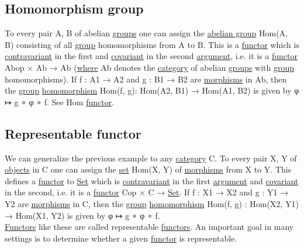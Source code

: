 \documentclass[11pt]{article}
\begin{document}
\subsection{\label{org4581f5e}Homomorphism group}
\label{sec:org06d5daf}

To every pair A, B of abelian \hyperref[org734e757]{groups} one can assign the \hyperref[org1992f6e]{abelian group} Hom(A, B) consisting of all \hyperref[orgc937439]{group} homomorphisms from A to B. This is a \hyperref[orgf2f6841]{functor} which is \hyperref[orge1bb5ad]{contravariant} in the first and \hyperref[org71a3b16]{covariant} in the second \hyperref[orga6b7e97]{argument}, i.e. it is a \hyperref[orgf2f6841]{functor} Abop × Ab → Ab (\hyperref[org3e5903d]{where} Ab denotes the \hyperref[org0450535]{category} of abelian \hyperref[org734e757]{groups} with \hyperref[orgc937439]{group} homomorphisms). If f : A1 → A2 and g : B1 → B2 are \hyperref[org6c2fa5c]{morphisms} in Ab, then the \hyperref[orgc937439]{group} \hyperref[org4991058]{homomorphism} Hom(f, g): Hom(A2, B1) → Hom(A1, B2) is given by φ ↦ g ∘ φ ∘ f. See Hom \hyperref[orgf2f6841]{functor}.\\

\subsection{\label{org1c3ae27}Representable functor}
\label{sec:orgbf4fc43}

We can generalize the previous example to any \hyperref[org0450535]{category} C. To every pair X, Y of \hyperref[org363acc2]{objects} in C one can assign the \hyperref[org1faf06d]{set} Hom(X, Y) of \hyperref[org6c2fa5c]{morphisms} from X to Y. This defines a \hyperref[orgf2f6841]{functor} to \hyperref[org1faf06d]{Set} which is \hyperref[orge1bb5ad]{contravariant} in the first \hyperref[orga6b7e97]{argument} and \hyperref[org71a3b16]{covariant} in the second, i.e. it is a \hyperref[orgf2f6841]{functor} Cop × C → \hyperref[org1faf06d]{Set}. If f : X1 → X2 and g : Y1 → Y2 are \hyperref[org6c2fa5c]{morphisms} in C, then the \hyperref[orgc937439]{group} \hyperref[org4991058]{homomorphism} Hom(f, g) : Hom(X2, Y1) → Hom(X1, Y2) is given by φ ↦ g ∘ φ ∘ f.\\

\hyperref[orgdd21ed6]{Functors} like these are called representable \hyperref[orgdd21ed6]{functors}. An important goal in many settings is to determine whether a given \hyperref[orgf2f6841]{functor} is representable.\\
\end{document}
